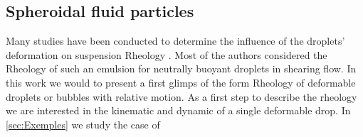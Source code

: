 

\subsection{Spheroidal fluid particles}

Many studies have been conducted to determine the influence of the droplets' deformation on suspension Rheology \citet{goddard1967nonlinear,lhuillier1987phenomenology,maffettone1998equation}.
Most of the authors considered the Rheology of such an emulsion for neutrally buoyant droplets in shearing flow. 
In this work we would to present a first glimps  of the form Rheology of deformable droplets or bubbles with relative motion. 
As a first step to describe the rheology we are interested in the kinematic and dynamic of a single deformable drop. 
In \ref{sec:Exemples} we study the case of 

